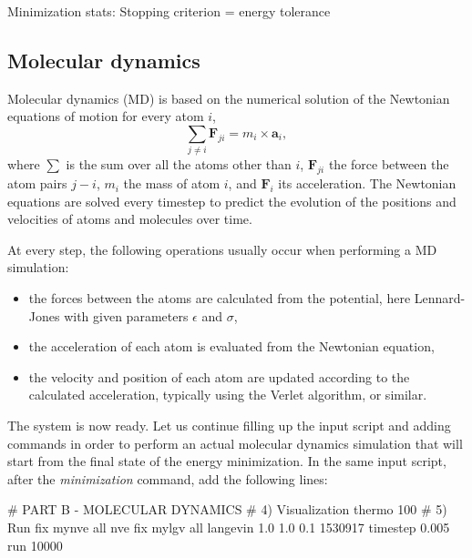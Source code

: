 \begin{lcverbatim}
Minimization stats:
Stopping criterion = energy tolerance
\end{lcverbatim}

\noindent \subsection{Molecular dynamics}

\begin{tcolorbox}[colback=mylightblue!5!white,colframe=mylightblue!75!black,title=Background Information -- What is molecular dynamics?]
Molecular dynamics (MD) is based on the numerical solution of the Newtonian
equations of motion for every atom $i$,
$$\sum_{j \ne i} \boldsymbol{F}_{ji} = m_i \times \boldsymbol{a}_i,$$
where $\sum$ is the sum over all the atoms other than $i$, 
$\boldsymbol{F}_{ji}$ the force between the atom pairs $j-i$,
$m_i$ the mass of atom $i$, and $\boldsymbol{F}_i$ its acceleration. 
The Newtonian equations are solved every timestep to predict the
evolution of the positions and velocities of atoms and molecules over time. 

At every step, the following operations usually occur when 
performing a MD simulation:
\begin{itemize}
\item the forces between the atoms are calculated from the potential, here Lennard-Jones with given parameters $\epsilon$ and $\sigma$,
\item the acceleration of each atom is evaluated from the Newtonian equation,
\item the velocity and position of each atom are updated according to the calculated acceleration, typically using the Verlet algorithm, or similar.
\end{itemize}
\end{tcolorbox}

\noindent The system is now ready. Let us continue filling up the
input script and adding commands in order to perform an actual molecular dynamics
simulation that will start from the final state of the energy minimization.
In the same input script, after the \textit{minimization} command, add the following
lines:

\begin{lcverbatim}
# PART B - MOLECULAR DYNAMICS
# 4) Visualization
thermo 100
# 5) Run
fix mynve all nve
fix mylgv all langevin 1.0 1.0 0.1 1530917
timestep 0.005
run 10000
\end{lcverbatim}

